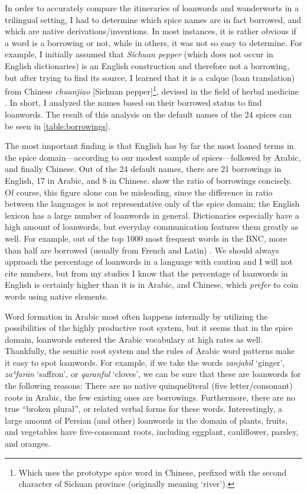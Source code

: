 In order to accurately compare the itineraries of loanwords and \glspl{wanderwort} in a trilingual setting, I had to determine which spice names are in fact borrowed, and which are native derivations/inventions. In most instances, it is rather obvious if a word is a borrowing or not, while in others, it was not so easy to determine. For example, I initially assumed that \textit{Sichuan pepper} (which does not occur in English dictionaries) is an English construction and therefore not a borrowing, but after trying to find its source, I learned that it is a calque (loan translation) from Chinese  \textit{chuanjiao} [Sichuan pepper]\footnote{Which uses the prototype spice word in Chinese, prefixed with the second character of Sichuan province (originally meaning `river').}, devised in the field of herbal medicine \autocite[140]{hooper_chinese_1929}. In short, I analyzed the names based on their borrowed status to find loanwords. The result of this analysis on the default names of the 24 spices can be seen in \cref{table:borrowings}.

The most important finding is that English has by far the most loaned terms in the spice domain---according to our modest sample of spices---followed by Arabic, and finally Chinese. Out of the 24 default names, there are 21 borrowings in English, 17 in Arabic, and 8 in Chinese.  show the ratio of borrowings concisely. Of course, this figure alone can be misleading, since the difference in ratio between the languages is not representative only of the spice domain; the English lexicon has a large number of loanwords in general. Dictionaries especially have a high amount of loanwords, but everyday communication features them greatly as well. For example, out of the top 1000 most frequent words in the \gls{BNC}, more than half are borrowed (usually from French and Latin) \autocite[38]{durkin_borrowed_2014}. We should always approach the percentage of loanwords in a language with caution and I will not cite numbers, but from my studies I know that the percentage of loanwords in English is certainly higher than it is in Arabic, and Chinese, which \textit{prefer} to coin words using native elements. 



Word formation in Arabic most often happens internally by utilizing the possibilities of the highly productive root system, but it seems that in the spice domain, loanwords entered the Arabic vocabulary at high rates as well. Thankfully, the semitic root system and the rules of Arabic word patterns make it easy to spot loanwords. For example, if we take the words \textit{zanjabīl} `ginger', \textit{zaʿfarān} `saffron', or \textit{qaranful} `cloves', we can be sure that these are loanwords for the following reasons: There are no native quinqueliteral (five letter/consonant) roots in Arabic, the few existing ones are borrowings. Furthermore, there are no true ``broken plural'', or related verbal forms for these words. Interestingly, a large amount of Persian (and other) loanwords in the domain of plants, fruits, and vegetables have five-consonant roots, including eggplant, cauliflower, parsley, and oranges.

